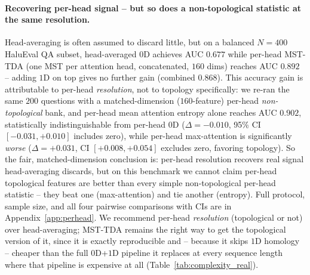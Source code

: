 \documentclass{article}
\begin{document}
\paragraph{Recovering per-head signal -- but so does a non-topological statistic at the same resolution.} Head-averaging is often assumed to discard little, but on a balanced $N{=}400$ HaluEval QA subset, head-averaged $0$D achieves AUC $0.677$ while per-head MST-TDA (one MST per attention head, concatenated, $160$ dims) reaches AUC $\mathbf{0.892}$ -- adding $1$D on top gives no further gain (combined $0.868$). This accuracy gain is attributable to per-head \emph{resolution}, not to topology specifically: we re-ran the same $200$ questions with a matched-dimension ($160$-feature) per-head \emph{non-topological} bank, and per-head mean attention entropy alone reaches AUC $0.902$, statistically indistinguishable from per-head $0$D ($\Delta=-0.010$, 95\% CI $[-0.031,+0.010]$ includes zero), while per-head max-attention is significantly \emph{worse} ($\Delta=+0.031$, CI $[+0.008,+0.054]$ excludes zero, favoring topology). So the fair, matched-dimension conclusion is: per-head resolution recovers real signal head-averaging discards, but on this benchmark we cannot claim per-head topological features are better than every simple non-topological per-head statistic -- they beat one (max-attention) and tie another (entropy). Full protocol, sample size, and all four pairwise comparisons with CIs are in Appendix~\ref{app:perhead}. We recommend per-head \emph{resolution} (topological or not) over head-averaging; MST-TDA remains the right way to get the topological version of it, since it is exactly reproducible and -- because it skips $1$D homology -- cheaper than the full $0$D+$1$D pipeline it replaces at every sequence length where that pipeline is expensive at all (Table~\ref{tab:complexity_real}).
\end{document}

